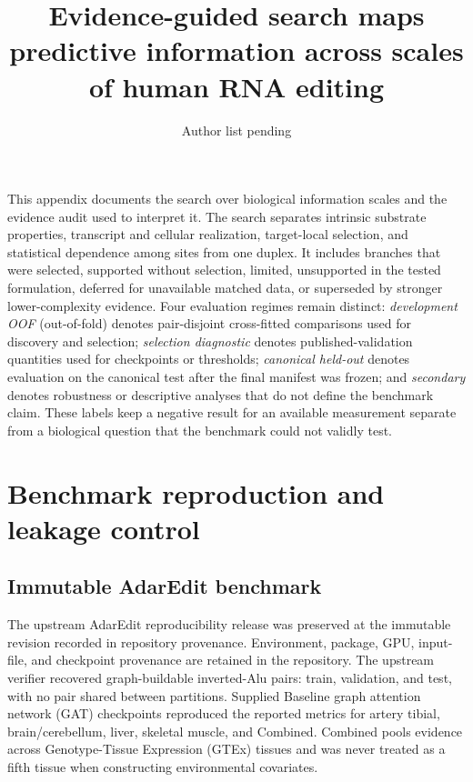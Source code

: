 \documentclass[9pt,twoside]{pnas-new}
\title{Evidence-guided search maps predictive information across scales of human RNA editing}
\author{Author list pending}
\begin{document}
\raggedbottom

\maketitle
\SItext

This appendix documents the search over biological information scales and the evidence audit used to interpret it. The search separates intrinsic substrate properties, transcript and cellular realization, target-local selection, and statistical dependence among sites from one duplex. It includes branches that were selected, supported without selection, limited, unsupported in the tested formulation, deferred for unavailable matched data, or superseded by stronger lower-complexity evidence. Four evaluation regimes remain distinct: \emph{development OOF} (out-of-fold) denotes pair-disjoint cross-fitted comparisons used for discovery and selection; \emph{selection diagnostic} denotes published-validation quantities used for checkpoints or thresholds; \emph{canonical held-out} denotes evaluation on the canonical test after the final manifest was frozen; and \emph{secondary} denotes robustness or descriptive analyses that do not define the benchmark claim. These labels keep a negative result for an available measurement separate from a biological question that the benchmark could not validly test.

\section{Benchmark reproduction and leakage control}\label{si:benchmark}

\subsection*{Immutable AdarEdit benchmark}

The upstream AdarEdit reproducibility release was preserved at the immutable revision recorded in repository provenance. Environment, package, GPU, input-file, and checkpoint provenance are retained in the repository. The upstream verifier recovered \NSubstrates{} graph-buildable inverted-Alu pairs: \NTrainPairs{} train, \NValidationPairs{} validation, and \NTestPairs{} test, with no pair shared between partitions. Supplied Baseline graph attention network (GAT) checkpoints reproduced the reported metrics for artery tibial, brain/cerebellum, liver, skeletal muscle, and Combined. Combined pools evidence across Genotype-Tissue Expression (GTEx) tissues and was never treated as a fifth tissue when constructing environmental covariates.
\end{document}
